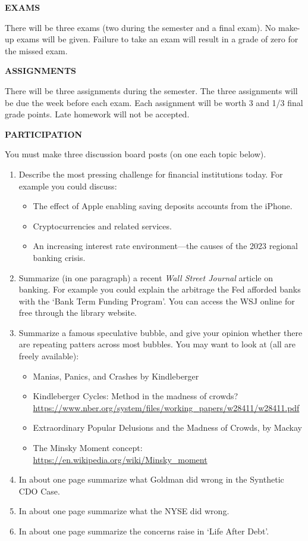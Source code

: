 \documentclass{article}
\begin{document}
\begin{center}
{\bf EXAMS} 
\end{center}
There will be three exams (two during the semester and a final exam). No make-up exams will be given.  Failure to take an exam will result in a grade of zero for the missed exam.  
\begin{center}
{\bf ASSIGNMENTS} 
\end{center}
There will be three assignments during the semester. The three assignments will be due the week before each exam. Each assignment will be worth 3 and 1/3 final grade points. Late homework will not be accepted.
\begin{center}
{\bf PARTICIPATION} 
\end{center}
You must make three discussion board posts (on one each topic below).
\begin{enumerate}
\item Describe the most pressing challenge for financial institutions today.  For example you could discuss:
\begin{itemize}
\item The effect of Apple enabling saving deposits accounts from the iPhone.
\item Cryptocurrencies and related services.
\item An increasing interest rate environment---the causes of the 2023 regional banking crisis.
\end{itemize}

\item Summarize (in one paragraph) a recent {\it Wall Street Journal} article on banking.  For example you could explain the arbitrage the Fed afforded banks with the `Bank Term Funding Program'.  You can access the WSJ online for free through the library website.

\item Summarize a famous speculative bubble, and give your opinion whether there are repeating patters across most bubbles.  You may want to look at (all are freely available):
  \begin{itemize}
  \item Manias, Panics, and Crashes by Kindleberger
  \item Kindleberger Cycles: Method in the madness of crowds? \url{https://www.nber.org/system/files/working_papers/w28411/w28411.pdf}
  \item Extraordinary Popular Delusions and the Madness of Crowds, by Mackay
  \item The Minsky Moment  concept: \url{https://en.wikipedia.org/wiki/Minsky_moment}
  \end{itemize}

\item In about one page summarize what Goldman did wrong in the Synthetic CDO Case.
\item In about one page summarize what the NYSE did wrong.
\item In about one page summarize the concerns raise in `Life After Debt'.
\end{enumerate}
\end{document}
